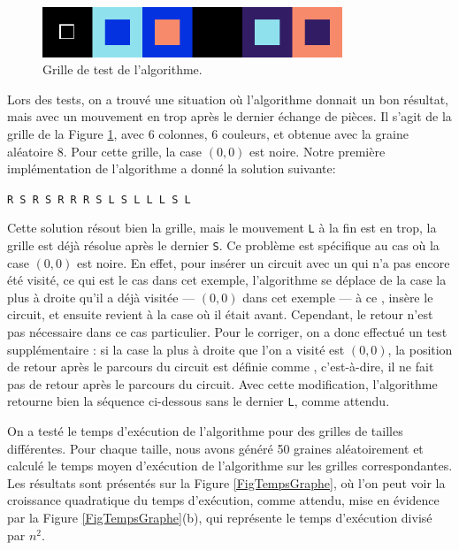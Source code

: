 \documentclass[a4paper,12pt]{article}
\numberwithin{equation}{section}
\begin{document}
\begin{figure}[ht]
\centering
\includegraphics[width=0.8\textwidth]{1_6_6_8}
\caption{Grille de test de l'algorithme.}
\label{FigGrille1668}
\end{figure}

Lors des tests, on a trouvé une situation où l'algorithme donnait un bon résultat, mais avec un mouvement en trop après le dernier échange de pièces. Il s'agit de la grille de la Figure \ref{FigGrille1668}, avec 6 colonnes, 6 couleurs, et obtenue avec la graine aléatoire 8. Pour cette grille, la case $(0, 0)$ est noire. Notre première implémentation de l'algorithme a donné la solution suivante:

\texttt{R S R S R R R S L S L L L S L}

Cette solution résout bien la grille, mais le mouvement \texttt{L} à la fin est en trop, la grille est déjà résolue après le dernier \texttt{S}. Ce problème est spécifique au cas où la case $(0, 0)$ est noire. En effet, pour insérer un circuit avec un \verb@jmin@ qui n'a pas encore été visité, ce qui est le cas dans cet exemple, l'algorithme se déplace de la case la plus à droite qu'il a déjà visitée --- $(0, 0)$ dans cet exemple --- à ce \verb@jmin@, insère le circuit, et ensuite revient à la case où il était avant. Cependant, le retour n'est pas nécessaire dans ce cas particulier. Pour le corriger, on a donc effectué un test supplémentaire : si la case la plus à droite que l'on a visité est $(0, 0)$, la position de retour après le parcours du circuit est définie comme \verb@jmin@, c'est-à-dire, il ne fait pas de retour après le parcours du circuit. Avec cette modification, l'algorithme retourne bien la séquence ci-dessous sans le dernier \texttt{L}, comme attendu.

On a testé le temps d'exécution de l'algorithme pour des grilles de tailles différentes. Pour chaque taille, nous avons généré 50 graines aléatoirement et calculé le temps moyen d'exécution de l'algorithme sur les grilles correspondantes. Les résultats sont présentés sur la Figure \ref{FigTempsGraphe}, où l'on peut voir la croissance quadratique du temps d'exécution, comme attendu, mise en évidence par la Figure \ref{FigTempsGraphe}(b), qui représente le temps d'exécution divisé par $n^2$.
\end{document}
